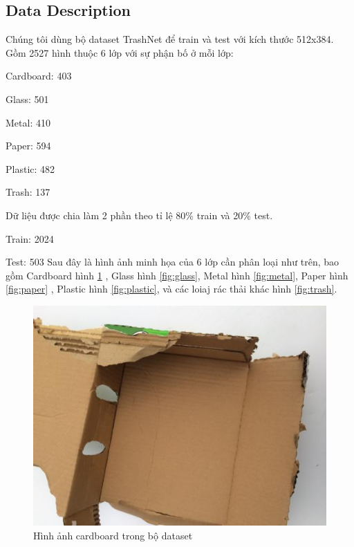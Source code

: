 \subsection{Data Description} %
Chúng tôi dùng bộ dataset TrashNet \cite{trashnet} để train và test với kích thước 512x384.
Gồm 2527 hình thuộc 6 lớp với sự phận bố ở mỗi lớp:
 
Cardboard: 403

Glass: 501

Metal: 410

Paper: 594

Plastic: 482

Trash: 137
 
Dữ liệu được chia làm 2 phần theo tỉ lệ 80\% train và 20\% test.

Train: 2024

Test: 503
Sau đây là hình ảnh minh họa của 6 lớp cần phân loại như trên, bao gồm Cardboard hình \ref{fig:cardboard} , Glass hình \ref{fig:glass}, Metal hình \ref{fig:metal}, Paper hình \ref{fig:paper} , Plastic hình \ref{fig:plastic}, và các loiaj rác thải khác hình \ref{fig:trash}.
\begin{figure}[ht]
    \centering
    \includegraphics[width=\linewidth]{images/Quanh/cardboard174.jpg}
    \caption{Hình ảnh cardboard trong bộ dataset}
    \label{fig:cardboard}
\end{figure}

